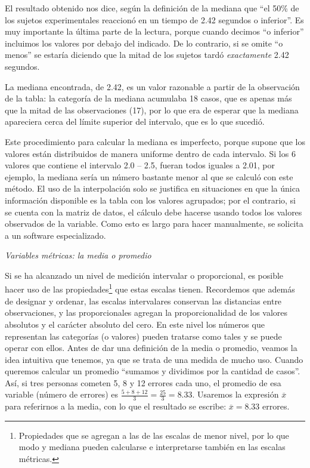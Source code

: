 \documentclass[]{book}
\let\rmarkdownfootnote\footnote%
\def\footnote{\protect\rmarkdownfootnote}
\begin{document}
El resultado obtenido nos dice, según la definición de la mediana que
``el 50\% de los sujetos experimentales reaccionó en un tiempo de 2.42
segundos o inferior''. Es muy importante la última parte de la lectura,
porque cuando decimos ``o inferior'' incluimos los valores por debajo del indicado. De lo contrario, si se omite ``o menos'' se estaría diciendo que la mitad de los sujetos tardó \emph{exactamente} 2.42 segundos.

La mediana encontrada, de 2.42, es un valor razonable a partir de la
observación de la tabla: la categoría de la mediana acumulaba 18 casos,
que es apenas más que la mitad de las observaciones (17), por lo que era
de esperar que la mediana apareciera cerca del límite superior del
intervalo, que es lo que sucedió.

Este procedimiento para calcular la mediana es imperfecto, porque supone que los valores están distribuidos de manera uniforme dentro de cada intervalo. Si los 6 valores que contiene el intervalo 2.0 -- 2.5, fueran
todos iguales a 2.01, por ejemplo, la mediana sería un número bastante
menor al que se calculó con este método. El uso de la interpolación solo
se justifica en situaciones en que la única información disponible es la
tabla con los valores agrupados; por el contrario, si se cuenta con la
matriz de datos, el cálculo debe hacerse usando todos los valores
observados de la variable. Como esto es largo para hacer manualmente, se
solicita a un software especializado.

\emph{Variables métricas: la media o promedio}

Si se ha alcanzado un nivel de medición intervalar o proporcional, es
posible hacer uso de las propiedades\footnote{Propiedades que se agregan a las de las escalas de menor nivel, por lo que modo y mediana pueden calcularse e interpretarse también en las escalas métricas.} que estas escalas tienen.
Recordemos que además de designar y ordenar, las escalas intervalares
conservan las distancias entre observaciones, y las proporcionales
agregan la proporcionalidad de los valores absolutos y el carácter
absoluto del cero. En este nivel los números que representan las
categorías (o valores) pueden tratarse como tales y se puede operar con ellos. Antes de dar una definición de la media o promedio, veamos la idea intuitiva que tenemos, ya que se trata de una medida de mucho uso.
Cuando queremos calcular un promedio ``sumamos y dividimos por la
cantidad de casos''. Así, si tres personas cometen 5, 8 y 12 errores cada uno, el promedio de esa variable (número de errores) es
\(\frac{5 + 8 + 12}{3} = \frac{25}{3} = 8.33\). Usaremos la expresión
\(\overline{x}\) para referirnos a la media, con lo que el resultado se
escribe: \(\overline{x} = 8.33\) errores.
\end{document}
